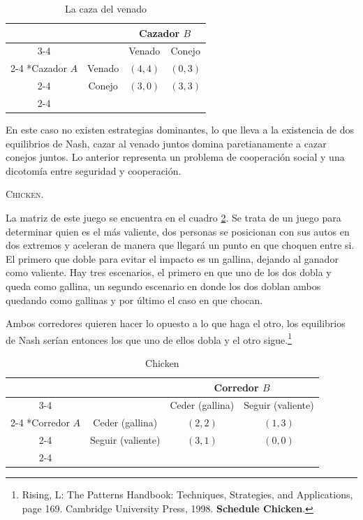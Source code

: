 \begin{table}[!htbp]
    \centering
    \caption{La caza del venado}
    \setlength{\extrarowheight}{2pt}
    \begin{tabular}{*{4}{c|}}
      \multicolumn{2}{c}{} & \multicolumn{2}{c}{Cazador $B$}\\\cline{3-4}
      \multicolumn{1}{c}{} &  & Venado  & Conejo \\\cline{2-4}
      \multirow{2}*{Cazador $A$}  & Venado & $(4,4)$ & $(0,3)$ \\\cline{2-4}
      & Conejo & $(3,0)$ & $(3,3)$ \\\cline{2-4}
    \end{tabular} \label{Juegos: Venado}
  \end{table}
En este caso no existen estrategias dominantes, lo que lleva a la existencia de dos equilibrios de Nash, cazar al venado juntos domina paretianamente a cazar conejos juntos. Lo anterior representa un problema de cooperación social y una dicotomía entre seguridad y cooperación. 

\textsc{Chicken}. 

La matriz de este juego se encuentra en el cuadro \ref{Juegos Chicken}. Se trata de un juego para determinar quien es el más valiente, dos personas se posicionan con sus autos en dos extremos y aceleran de manera que llegará un punto en que choquen entre si. El primero que doble para evitar el impacto es un gallina, dejando al ganador como valiente. Hay tres escenarios, el primero en que uno de los dos dobla y queda como gallina, un segundo escenario en donde los dos doblan ambos quedando como gallinas y por último el caso en que chocan. 

Ambos corredores quieren hacer lo opuesto a lo que haga el otro, los equilibrios de Nash serían entonces los que uno de ellos dobla y el otro sigue.\footnote{Rising, L: The Patterns Handbook: Techniques, Strategies, and Applications, page 169. Cambridge University Press, 1998. \textbf{Schedule Chicken}.}
\begin{table}[!htbp]
    \centering 
    \caption{Chicken}
    \setlength{\extrarowheight}{2pt}
    \begin{tabular}{*{4}{c|}}
      \multicolumn{2}{c}{} & \multicolumn{2}{c}{Corredor $B$}\\\cline{3-4}
      \multicolumn{1}{c}{} &  & Ceder (gallina)  & Seguir (valiente) \\\cline{2-4}
      \multirow{2}*{Corredor $A$}  & Ceder (gallina) & $(2,2)$ & $(1,3)$ \\\cline{2-4}
      & Seguir (valiente) & $(3,1)$ & $(0,0)$ \\\cline{2-4}
    \end{tabular} \label{Juegos Chicken}
  \end{table}

